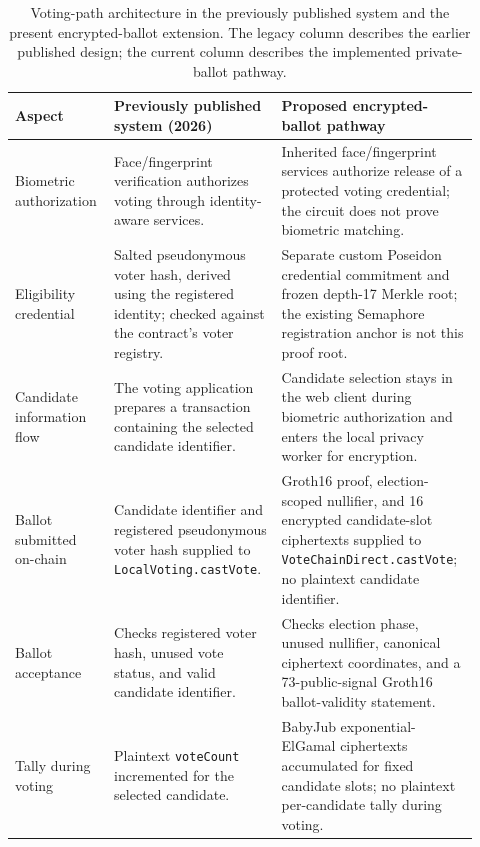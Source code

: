 \begin{table}[tbp]
\centering
\caption{Voting-path architecture in the previously published system and the present encrypted-ballot extension. The legacy column describes
the earlier published design; the current column describes the implemented
private-ballot pathway.}
\label{tab:architecture-prior-comparison}
\footnotesize
\setlength{\tabcolsep}{4pt}
\renewcommand{\arraystretch}{1.12}
\begin{tabular}{@{}>{\raggedright\arraybackslash}p{0.18\linewidth}>{\raggedright\arraybackslash}p{0.34\linewidth}>{\raggedright\arraybackslash}p{0.40\linewidth}@{}}
\toprule
\textbf{Aspect} & \textbf{Previously published system (2026)} & \textbf{Proposed encrypted-ballot pathway} \\
\midrule
Biometric authorization &
Face/fingerprint verification authorizes voting through identity-aware services. &
Inherited face/fingerprint services authorize release of a protected voting credential; the circuit does not prove biometric matching. \\
\addlinespace[3pt]
Eligibility credential &
Salted pseudonymous voter hash, derived using the registered identity; checked against the contract's voter registry. &
Separate custom Poseidon credential commitment and frozen depth-17 Merkle root; the existing Semaphore registration anchor is not this proof root. \\
\addlinespace[3pt]
Candidate information flow &
The voting application prepares a transaction containing the selected candidate identifier. &
Candidate selection stays in the web client during biometric authorization and enters the local privacy worker for encryption. \\
\addlinespace[3pt]
Ballot submitted on-chain &
Candidate identifier and registered pseudonymous voter hash supplied to \texttt{LocalVoting.castVote}. &
Groth16 proof, election-scoped nullifier, and 16 encrypted candidate-slot ciphertexts supplied to \texttt{VoteChainDirect.castVote}; no plaintext candidate identifier. \\
\addlinespace[3pt]
Ballot acceptance &
Checks registered voter hash, unused vote status, and valid candidate identifier. &
Checks election phase, unused nullifier, canonical ciphertext coordinates, and a 73-public-signal Groth16 ballot-validity statement. \\
\addlinespace[3pt]
Tally during voting &
Plaintext \texttt{voteCount} incremented for the selected candidate. &
BabyJub exponential-ElGamal ciphertexts accumulated for fixed candidate slots; no plaintext per-candidate tally during voting. \\

\end{tabular}
\end{table}
